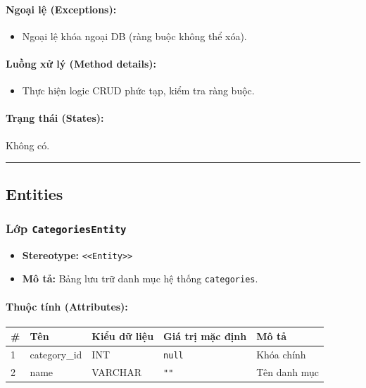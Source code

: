 \documentclass[12pt,a4paper]{article}
\begin{document}
\paragraph{Ngoại lệ (Exceptions):}
\begin{itemize}[leftmargin=*]
    \item Ngoại lệ khóa ngoại DB (ràng buộc không thể xóa).
\end{itemize}


\paragraph{Luồng xử lý (Method details):}
\begin{itemize}[leftmargin=*]
    \item Thực hiện logic CRUD phức tạp, kiểm tra ràng buộc.
\end{itemize}


\paragraph{Trạng thái (States):}
Không có.

\vskip 0.5cm
\noindent\rule{\textwidth}{0.5pt}
\vskip 0.5cm

\subsection{Entities}


\subsubsection{Lớp \texttt{CategoriesEntity}}

\begin{itemize}[leftmargin=*]
    \item \textbf{Stereotype:} \texttt{\textless{}\textless{}Entity\textgreater{}\textgreater{}}
    \item \textbf{Mô tả:} Bảng lưu trữ danh mục hệ thống \texttt{categories}.
\end{itemize}

\paragraph{Thuộc tính (Attributes):}
\begin{longtable}{|p{0.6cm}|p{3.5cm}|p{2.4cm}|p{1.8cm}|p{5.1cm}|}
\hline
\textbf{\#} & \textbf{Tên} & \textbf{Kiểu dữ liệu} & \textbf{Giá trị mặc định} & \textbf{Mô tả} \\ \hline
\endhead
1 & category\_id & INT & \texttt{null} & Khóa chính \\ \hline
2 & name & VARCHAR & \texttt{""} & Tên danh mục \\ \hline
\end{longtable}
\end{document}
